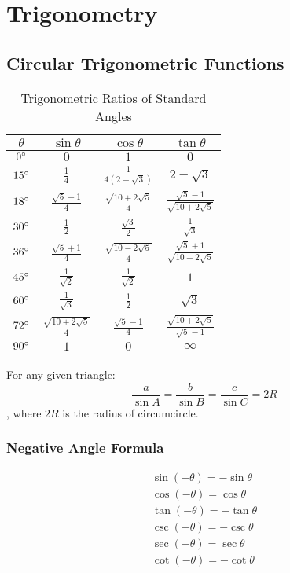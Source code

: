 \documentclass[openany, oneside]{book}
\begin{document}

\part{Trigonometry}
\large{\chapter{Circular Trigonometric Functions}}
\begin{table}[H]
\begin{center}
\caption{Trigonometric Ratios of Standard Angles}
\label{table1}
\begin{tabular}{c|ccc}
$\theta$&$\sin \theta$&$\cos \theta$&$\tan \theta$\\
\hline
$0\degree$&$0$&$1$&$0$\\
$15\degree$&$\frac{1}{4}$&$\frac{1}{4(2-\sqrt{3})}$&$2-\sqrt{3}$\\
$18\degree$&$\frac{\sqrt{5}-1}{4}$&$\frac{\sqrt{10+2\sqrt{5}}}{4}$&$\frac{\sqrt{5}-1}{\sqrt{10+2\sqrt{5}}}$\\
$30\degree$&$\frac{1}{2}$&$\frac{\sqrt{3}}{2}$&$\frac{1}{\sqrt{3}}$\\
$36\degree$&$\frac{\sqrt{5}+1}{4}$&$\frac{\sqrt{10-2\sqrt{5}}}{4}$&$\frac{\sqrt{5}+1}{\sqrt{10-2\sqrt{5}}}$\\
$45\degree$&$\frac{1}{\sqrt{2}}$&$\frac{1}{\sqrt{2}}$&$1$\\
$60\degree$&$\frac{1}{\sqrt{3}}$&$\frac{1}{2}$&$\sqrt{3}$\\
$72\degree$&$\frac{\sqrt{10+2\sqrt{5}}}{4}$&$\frac{\sqrt{5}-1}{4}$&$\frac{\sqrt{10+2\sqrt{5}}}{\sqrt{5}-1}$\\
$90\degree$&$1$&$0$&$\infty$\\
\hline
\end{tabular}
\end{center}
\end{table}

For any given triangle:
\begin{equation}
\dfrac{a}{\sin A}=\dfrac{b}{\sin B}=\dfrac{c}{\sin C}=2R
\end{equation}, where $2R$ is the radius of circumcircle.

\section{Negative Angle Formula}
\begin{align}
\sin (-\theta)=-\sin \theta\\
\cos (-\theta)=\cos \theta\\
\tan (-\theta)=-\tan \theta\\
\csc (-\theta)=-\csc \theta\\
\sec (-\theta)=\sec \theta\\
\cot (-\theta)=-\cot \theta
\end{align}
\end{document}
